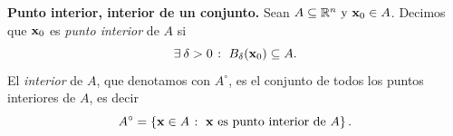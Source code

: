  \begin{definition} \textbf{Punto interior, interior de un conjunto.} \label{def:interior}
    Sean $A  \subseteq  \Rn{n} \text{ y } \vect{x}_0 \in A$. Decimos que $\vect{x}_0$ es \emph{punto interior} de $A$ si
    \[
     \exists\:\delta > 0  \; \colon \; B_{\delta}(\vect{x}_0)  \subseteq  A.
    \]
    El \emph{interior} de $A$, que denotamos con $A^{\circ}$, es el conjunto de todos los puntos interiores de $A$, es decir
    \[
    A^{\circ}= \left\lbrace\vect{x}\in A  \; \colon \; \vect{x}\text{ es punto interior de } A \right\rbrace.
    \]
   \end{definition}